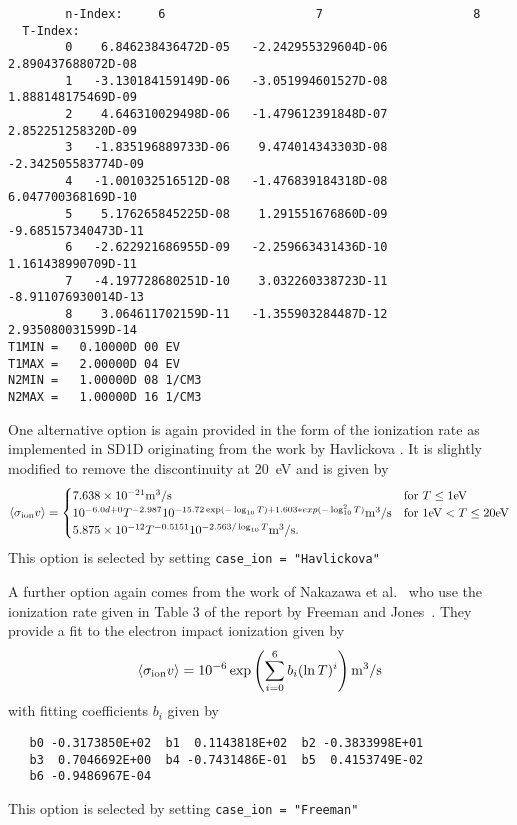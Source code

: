 \documentclass[amsmath,amssymb,a4]{revtex4}
\begin{document}
\begin{small}
\begin{verbatim}
        n-Index:     6                     7                     8
  T-Index:
        0    6.846238436472D-05   -2.242955329604D-06    2.890437688072D-08
        1   -3.130184159149D-06   -3.051994601527D-08    1.888148175469D-09
        2    4.646310029498D-06   -1.479612391848D-07    2.852251258320D-09
        3   -1.835196889733D-06    9.474014343303D-08   -2.342505583774D-09
        4   -1.001032516512D-08   -1.476839184318D-08    6.047700368169D-10
        5    5.176265845225D-08    1.291551676860D-09   -9.685157340473D-11
        6   -2.622921686955D-09   -2.259663431436D-10    1.161438990709D-11
        7   -4.197728680251D-10    3.032260338723D-11   -8.911076930014D-13
        8    3.064611702159D-11   -1.355903284487D-12    2.935080031599D-14
T1MIN =   0.10000D 00 EV
T1MAX =   2.00000D 04 EV
N2MIN =   1.00000D 08 1/CM3
N2MAX =   1.00000D 16 1/CM3
\end{verbatim}\end{small}

One alternative option is again provided in the form of the ionization rate as implemented in SD1D originating from the work by Havlickova \cite{havlickova2013}. It is slightly modified to remove the discontinuity at 20~eV and is given by \cite{SD1D}
\begin{equation}\label{ionization_SD1D}
    \langle\sigma_{\rm ion} v\rangle = \begin{cases} 7.638 \times 10^{-21} {\rm m}^3/{\rm s}             & \mbox{for } T \le 1 {\rm eV} \\
                                        10^{-6.0d+0} T^{-2.987} 10^{-15.72 \exp(-\log_{10}T) + 1.603*exp(-\log_{10}^2T)} {\rm m}^3/{\rm s} & \mbox{for } 1 {\rm eV} < T \le 20 {\rm eV} \\
                                        5.875 \times 10^{-12} T^{-0.5151} 10^{-2.563/\log_{10}T} {\rm m}^3/{\rm s}. \end{cases}
\end{equation}
This option is selected by setting {\tt case\_ion = "Havlickova"}

A further option again comes from the work of Nakazawa et al.~\cite{nakazawa2000} who use the ionization rate given in Table 3 of the report by Freeman and Jones~\cite{freeman1974}. They provide a fit to the electron impact ionization given by
\begin{equation}\label{charge_exchange_FJ}
    \langle\sigma_{\rm ion} v\rangle = 10^{-6} \exp\left( \sum_{i=0}^6 b_i (\ln T)^i \right)  {\rm m}^3/{\rm s}
\end{equation}
with fitting coefficients $b_i$ given by
\begin{small}\begin{verbatim}
   b0 -0.3173850E+02  b1  0.1143818E+02  b2 -0.3833998E+01
   b3  0.7046692E+00  b4 -0.7431486E-01  b5  0.4153749E-02
   b6 -0.9486967E-04
\end{verbatim}\end{small}
This option is selected by setting {\tt case\_ion = "Freeman"}
\end{document}

